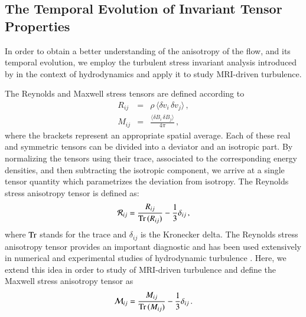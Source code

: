 \documentclass[]{emulateapj}
\begin{document}
\subsection{The Temporal Evolution of Invariant Tensor Properties}
\label{lumley}

In order to obtain a better understanding of the anisotropy of the flow, and its temporal
evolution, we employ the turbulent stress invariant analysis introduced by 
\citet{1977JFM....82..161L} in the context of hydrodynamics and apply it to study 
MRI-driven turbulence.

The Reynolds and Maxwell stress tensors are defined according to 
\begin{eqnarray}
R_{ij}&=& \rho \, \langle \delta v_i \, \delta v_j \rangle \,, 
\label{eq:reynolds_stress}\\
M_{ij}&=& \frac{\langle \delta B_i \, \delta B_j \rangle}{4\pi} \,, 
\label{eq:maxwell_stress}
\end{eqnarray}
where the brackets represent an appropriate spatial average.
Each of these real and symmetric tensors can be divided into a deviator and an isotropic part.
By normalizing the tensors using their trace, associated to the corresponding
energy densities, and then subtracting the isotropic component, we arrive at a 
single tensor quantity which parametrizes the deviation from isotropy.
The Reynolds stress anisotropy tensor \citep{1977JFM....82..161L} is defined as:
\begin{equation}
\mathcal{R}_{ij}=\frac{R_{ij} }{{\rm Tr}\,(R_{ij}) } - \frac{1}{3} \delta_{ij} \,,
\end{equation}
where ${\rm Tr}$ stands for the trace and $\delta_{ij}$ is the Kronecker delta. 
The Reynolds stress anisotropy tensor provides an 
important diagnostic and has been used extensively in numerical and experimental
studies of hydrodynamic turbulence \citep{Biferale:2005cwa}. Here, we extend this idea
in order to study of MRI-driven turbulence and define the Maxwell stress anisotropy tensor as
\begin{equation}
\mathcal{M}_{ij}=\frac{M_{ij} }{{\rm Tr}\,(M_{ij}) } - \frac{1}{3} \delta_{ij} \,.
\end{equation}
\end{document}

